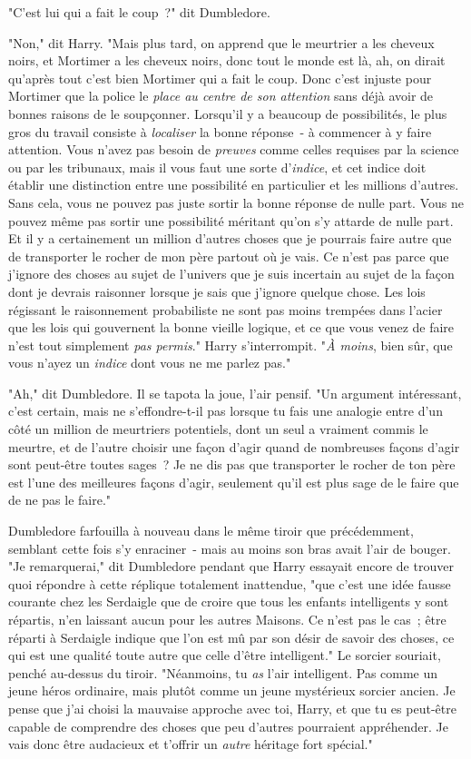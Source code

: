 "C'est lui qui a fait le coup~?" dit Dumbledore.

"Non," dit Harry. "Mais plus tard, on apprend que le meurtrier a les cheveux noirs, et Mortimer a les cheveux noirs, donc tout le monde est là, ah, on dirait qu'après tout c'est bien Mortimer qui a fait le coup. Donc c'est injuste pour Mortimer que la police le \emph{place au centre de son attention} sans déjà avoir de bonnes raisons de le soupçonner. Lorsqu'il y a beaucoup de possibilités, le plus gros du travail consiste à \emph{localiser} la bonne réponse~- à commencer à y faire attention. Vous n'avez pas besoin de \emph{preuves} comme celles requises par la science ou par les tribunaux, mais il vous faut une sorte d'\emph{indice}, et cet indice doit établir une distinction entre une possibilité en particulier et les millions d'autres. Sans cela, vous ne pouvez pas juste sortir la bonne réponse de nulle part. Vous ne pouvez même pas sortir une possibilité méritant qu'on s'y attarde de nulle part. Et il y a certainement un million d'autres choses que je pourrais faire autre que de transporter le rocher de mon père partout où je vais. Ce n'est pas parce que j'ignore des choses au sujet de l'univers que je suis incertain au sujet de la façon dont je devrais raisonner lorsque je sais que j'ignore quelque chose. Les lois régissant le raisonnement probabiliste ne sont pas moins trempées dans l'acier que les lois qui gouvernent la bonne vieille logique, et ce que vous venez de faire n'est tout simplement \emph{pas permis}." Harry s'interrompit. "\emph{À moins}, bien sûr, que vous n'ayez un \emph{indice} dont vous ne me parlez pas."

"Ah," dit Dumbledore. Il se tapota la joue, l'air pensif. "Un argument intéressant, c'est certain, mais ne s'effondre-t-il pas lorsque tu fais une analogie entre d'un côté un million de meurtriers potentiels, dont un seul a vraiment commis le meurtre, et de l'autre choisir une façon d'agir quand de nombreuses façons d'agir sont peut-être toutes sages~? Je ne dis pas que transporter le rocher de ton père est l'une des meilleures façons d'agir, seulement qu'il est plus sage de le faire que de ne pas le faire."

Dumbledore farfouilla à nouveau dans le même tiroir que précédemment, semblant cette fois s'y enraciner~- mais au moins son bras avait l'air de bouger. "Je remarquerai," dit Dumbledore pendant que Harry essayait encore de trouver quoi répondre à cette réplique totalement inattendue, "que c'est une idée fausse courante chez les Serdaigle que de croire que tous les enfants intelligents y sont répartis, n'en laissant aucun pour les autres Maisons. Ce n'est pas le cas~; être réparti à Serdaigle indique que l'on est mû par son désir de savoir des choses, ce qui est une qualité toute autre que celle d'être intelligent." Le sorcier souriait, penché au-dessus du tiroir. "Néanmoins, tu \emph{as} l'air intelligent. Pas comme un jeune héros ordinaire, mais plutôt comme un jeune mystérieux sorcier ancien. Je pense que j'ai choisi la mauvaise approche avec toi, Harry, et que tu es peut-être capable de comprendre des choses que peu d'autres pourraient appréhender. Je vais donc être audacieux et t'offrir un \emph{autre} héritage fort spécial."

